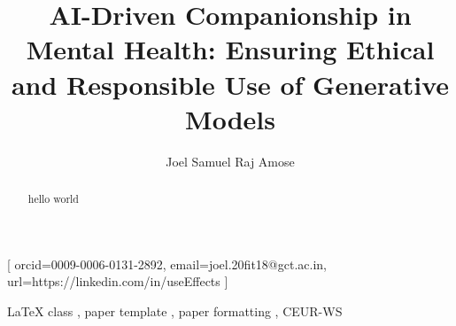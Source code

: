 

\title{AI-Driven Companionship in Mental Health: Ensuring Ethical and Responsible Use of Generative Models}

\author[1]{Joel Samuel Raj Amose}[
    orcid=0009-0006-0131-2892,
    email=joel.20fit18@gct.ac.in,
    url=https://linkedin.com/in/useEffects
]

\begin{abstract}
    hello world
\end{abstract}

\begin{keywords}
    LaTeX class \sep
    paper template \sep
    paper formatting \sep
    CEUR-WS
\end{keywords}

\maketitle
